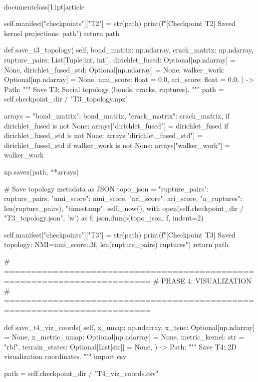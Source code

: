 \\documentclass[11pt]{article}
\begin{document}
\begin{CodeBlock}
        self.manifest["checkpoints"]["T2"] = str(path)
        print(f"[Checkpoint T2] Saved kernel projections: {path}")
        return path

    def save_t3_topology(
        self,
        bond_matrix: np.ndarray,
        crack_matrix: np.ndarray,
        rupture_pairs: List[Tuple[int, int]],
        dirichlet_fused: Optional[np.ndarray] = None,
        dirichlet_fused_std: Optional[np.ndarray] = None,
        walker_work: Optional[np.ndarray] = None,
        nmi_score: float = 0.0,
        ari_score: float = 0.0,
    ) -> Path:
        """
        Save T3: Social topology (bonds, cracks, ruptures).
        """
        path = self.checkpoint_dir / "T3_topology.npz"

        arrays = {
            "bond_matrix": bond_matrix,
            "crack_matrix": crack_matrix,
        }
        if dirichlet_fused is not None:
            arrays["dirichlet_fused"] = dirichlet_fused
        if dirichlet_fused_std is not None:
            arrays["dirichlet_fused_std"] = dirichlet_fused_std
        if walker_work is not None:
            arrays["walker_work"] = walker_work

        np.savez(path, **arrays)

        # Save topology metadata as JSON
        topo_json = {
            "rupture_pairs": rupture_pairs,
            "nmi_score": nmi_score,
            "ari_score": ari_score,
            "n_ruptures": len(rupture_pairs),
            "timestamp": self._now(),
        }
        with open(self.checkpoint_dir / "T3_topology.json", 'w') as f:
            json.dump(topo_json, f, indent=2)

        self.manifest["checkpoints"]["T3"] = str(path)
        print(f"[Checkpoint T3] Saved topology: NMI={nmi_score:.3f}, {len(rupture_pairs)} ruptures")
        return path

    # =========================================================================
    # PHASE 4: VISUALIZATION
    # =========================================================================

    def save_t4_viz_coords(
        self,
        x_umap: np.ndarray,
        x_tsne: Optional[np.ndarray] = None,
        x_metric_umap: Optional[np.ndarray] = None,
        metric_kernel: str = "rbf",
        terrain_states: Optional[List[str]] = None,
    ) -> Path:
        """
        Save T4: 2D visualization coordinates.
        """
        import csv

        path = self.checkpoint_dir / "T4_viz_coords.csv"


\end{CodeBlock}
\end{document}
